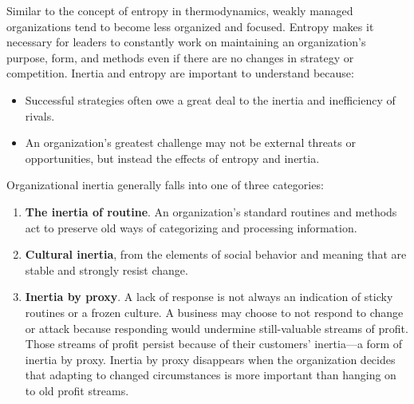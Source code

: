 \documentclass{article}
\newenvironment{nosepitemize}
{ \begin{itemize}
    \setlength{\itemsep}{0pt}
    \setlength{\parskip}{0pt}
    \setlength{\parsep}{0pt}     }
{ \end{itemize}                  }
\newenvironment{nosepenumerate}
{ \begin{enumerate}
    \setlength{\itemsep}{0pt}
    \setlength{\parskip}{0pt}
    \setlength{\parsep}{0pt}     }
{ \end{enumerate}                  }
\begin{document}
\begin{multicols}{2}
Similar to the concept of entropy in thermodynamics, weakly managed organizations tend to become less organized and focused. Entropy makes it necessary for leaders to constantly work on maintaining an organization’s purpose, form, and methods even if there are no changes in strategy or competition. Inertia and entropy are important to understand because:

\begin{nosepitemize}
    \item Successful strategies often owe a great deal to the inertia and inefficiency of rivals.
    \item An organization’s greatest challenge may not be external threats or opportunities, but instead the effects of entropy and inertia.
\end{nosepitemize}

Organizational inertia generally falls into one of three categories:

\begin{nosepenumerate}
    \item \textbf{The inertia of routine}. An organization’s standard routines and methods act to preserve old ways of categorizing and processing information.
    \item \textbf{Cultural inertia}, from the elements of social behavior and meaning that are stable and strongly resist change.
    \item \textbf{Inertia by proxy}. A lack of response is not always an indication of sticky routines or a frozen culture. A business may choose to not respond to change or attack because responding would undermine still-valuable streams of profit. Those streams of profit persist because of their customers’ inertia—a form of inertia by proxy. Inertia by proxy disappears when the organization decides that adapting to changed circumstances is more important than hanging on to old profit streams.
\end{nosepenumerate}

\end{multicols}
\end{document}

